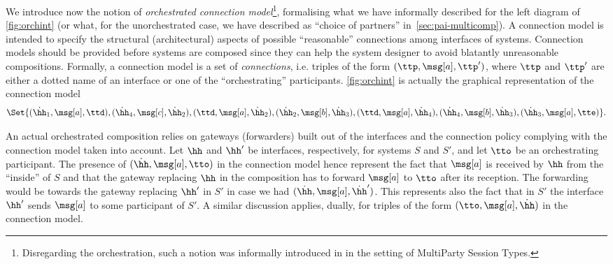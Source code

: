  We introduce now the notion of {\em orchestrated connection model}\footnote{Disregarding the orchestration, such a notion was informally introduced in \cite{BDGY23}
in the setting of MultiParty Session Types.}, formalising what we have informally described
for the left diagram of \cref{fig:orchint} (or what, for the unorchestrated case, we have described as  ``choice of partners'' in~\cref{sec:pai-multicomp}).
%
A connection model is intended to  specify  the structural
(architectural)  aspects of possible ``reasonable'' connections  among interfaces of systems. 
% 
Connection models should be provided before systems are composed since they can help the
system designer to avoid blatantly unreasonable compositions.
Formally, a connection model is a set of {\em connections}, i.e. triples 
 of the form $(\ttp, \msg[a],\ttp')$, where $\ttp$ and $\ttp'$ are either a
 dotted name of an interface or one of the ``orchestrating'' participants.  
 \cref{fig:orchint} is actually the graphical representation  of the connection model
 $$
 \Set{(\dot\hh_1, \msg[a],\ttd),(\dot\hh_4, \msg[c],\dot\hh_2),(\ttd, \msg[a],\dot\hh_2),(\dot\hh_2, \msg[b],\dot\hh_3),
         (\ttd, \msg[a],\dot\hh_4),(\dot\hh_4, \msg[b],\dot\hh_3),(\dot\hh_3, \msg[a],\tte)}.
$$


 
An actual orchestrated composition relies on gateways (forwarders)
 built out of the interfaces and the connection policy complying with 
the connection model taken into account. 
Let $\hh$ and $\hh'$ be interfaces, respectively, for systems $S$ and $S'$, and let
$\tto$ be an orchestrating participant.
The presence of $(\dot\hh, \msg[a],\tto)$ in the connection model
hence represent the fact that  $\msg[a]$ is received by $\hh$ from the ``inside'' of $S$
and that the gateway replacing $\hh$ in the composition has to forward $\msg[a]$ to $\tto$ 
after its reception.
The forwarding would be towards the gateway replacing $\hh'$ in $S'$ in case we had
$(\dot\hh, \msg[a],\dot\hh')$. This represents also the fact that in $S'$ the  interface $\hh'$
sends $\msg[a]$ to some participant of $S'$.
A similar  discussion applies, dually, for triples  of the form $(\tto, \msg[a],\dot\hh)$ in the connection model.

